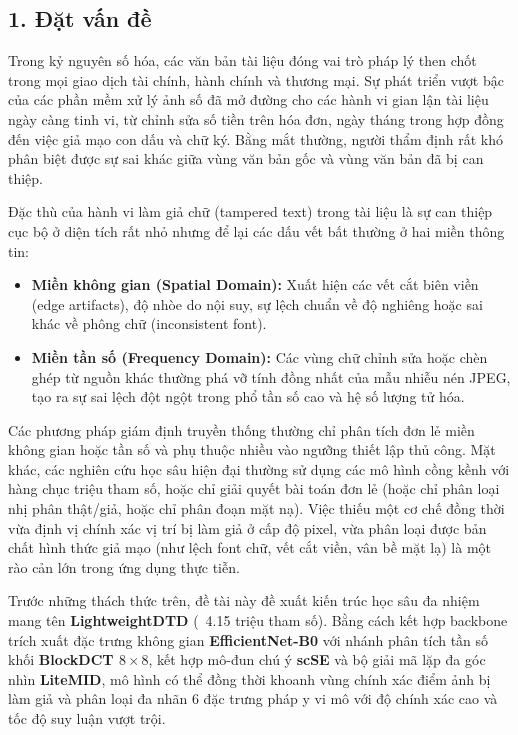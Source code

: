 \subsection{1. Đặt vấn đề}

\indent\indent Trong kỷ nguyên số hóa, các văn bản tài liệu đóng vai trò pháp lý then chốt trong mọi giao dịch tài chính, hành chính và thương mại. Sự phát triển vượt bậc của các phần mềm xử lý ảnh số đã mở đường cho các hành vi gian lận tài liệu ngày càng tinh vi, từ chỉnh sửa số tiền trên hóa đơn, ngày tháng trong hợp đồng đến việc giả mạo con dấu và chữ ký. Bằng mắt thường, người thẩm định rất khó phân biệt được sự sai khác giữa vùng văn bản gốc và vùng văn bản đã bị can thiệp.\vspace{0.3cm}

Đặc thù của hành vi làm giả chữ (tampered text) trong tài liệu là sự can thiệp cục bộ ở diện tích rất nhỏ nhưng để lại các dấu vết bất thường ở hai miền thông tin:\vspace{-0.1cm}
\begin{itemize}[label={--}, itemsep=1pt]
    \item \textbf{Miền không gian (Spatial Domain):} Xuất hiện các vết cắt biên viền (edge artifacts), độ nhòe do nội suy, sự lệch chuẩn về độ nghiêng hoặc sai khác về phông chữ (inconsistent font).
    \item \textbf{Miền tần số (Frequency Domain):} Các vùng chữ chỉnh sửa hoặc chèn ghép từ nguồn khác thường phá vỡ tính đồng nhất của mẫu nhiễu nén JPEG, tạo ra sự sai lệch đột ngột trong phổ tần số cao và hệ số lượng tử hóa.
\end{itemize}

Các phương pháp giám định truyền thống thường chỉ phân tích đơn lẻ miền không gian hoặc tần số và phụ thuộc nhiều vào ngưỡng thiết lập thủ công. Mặt khác, các nghiên cứu học sâu hiện đại thường sử dụng các mô hình cồng kềnh với hàng chục triệu tham số, hoặc chỉ giải quyết bài toán đơn lẻ (hoặc chỉ phân loại nhị phân thật/giả, hoặc chỉ phân đoạn mặt nạ). Việc thiếu một cơ chế đồng thời vừa định vị chính xác vị trí bị làm giả ở cấp độ pixel, vừa phân loại được bản chất hình thức giả mạo (như lệch font chữ, vết cắt viền, vân bề mặt lạ) là một rào cản lớn trong ứng dụng thực tiễn.\vspace{0.3cm}

Trước những thách thức trên, đề tài này đề xuất kiến trúc học sâu đa nhiệm mang tên \textbf{LightweightDTD} (~4.15 triệu tham số). Bằng cách kết hợp backbone trích xuất đặc trưng không gian \textbf{EfficientNet-B0} với nhánh phân tích tần số khối \textbf{BlockDCT $8 \times 8$}, kết hợp mô-đun chú ý \textbf{scSE} và bộ giải mã lặp đa góc nhìn \textbf{LiteMID}, mô hình có thể đồng thời khoanh vùng chính xác điểm ảnh bị làm giả và phân loại đa nhãn 6 đặc trưng pháp y vi mô với độ chính xác cao và tốc độ suy luận vượt trội.
